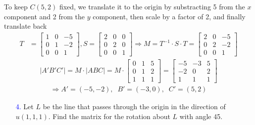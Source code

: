 \documentclass[11pt]{article}  %
\begin{document}
    \solution
    
    To keep $C(5,2)$ fixed, we translate it to the origin by substracting 5 from the $x$ component and 2 from the $y$ component, then scale by a factor of 2, and finally translate back
    \begin{align*}
        T &=
        \begin{bmatrix}
            1 & 0 & -5\\
            0 & 1 & -2\\
            0 & 0 & 1
        \end{bmatrix}, S =
        \begin{bmatrix}
            2 & 0 & 0\\
            0 & 2 & 0\\
            0 & 0 & 1
        \end{bmatrix} \Rightarrow M = T^{-1} \cdot S \cdot T =
        \begin{bmatrix}
            2 & 0 & -5\\
            0 & 2 & -2\\
            0 & 0 &  1
        \end{bmatrix}
    \end{align*}
    \begin{align*}
        |A' B' C'| = M \cdot |A B C| = M \cdot
        \begin{bmatrix}
            0 & 1 & 5\\
            0 & 1 & 2\\
            1 & 1 & 1
        \end{bmatrix}=
        \begin{bmatrix}
            -5 & -3 & 5\\
            -2 & 0 & 2\\
            1 & 1 & 1
        \end{bmatrix}
    \end{align*}
    \begin{align*}
        \Rightarrow A' = (-5, -2),\;\;B' = (-3, 0),\;\;C' = (5, 2)
    \end{align*}

    \begin{enumerate}[leftmargin=*]
        \item[\textcolor{blue}{4.}] Let $L$ be the line that passes through the origin in the direction of $u(1,1,1)$. Find the matrix for the rotation about $L$ with angle 45\textdegree\hspace{0mm}.
    \end{enumerate}
    
\end{document}
